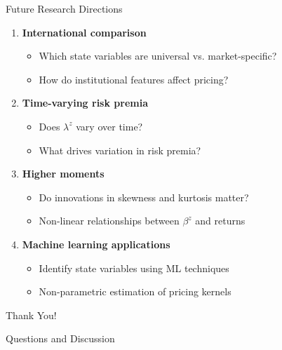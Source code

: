 \documentclass{beamer}
\begin{document}
\begin{frame}{Future Research Directions}
\begin{enumerate}
\item \textbf{International comparison}
\begin{itemize}
\item Which state variables are universal vs. market-specific?
\item How do institutional features affect pricing?
\end{itemize}
\vspace{0.2cm}

\item \textbf{Time-varying risk premia}
\begin{itemize}
\item Does $\lambda^z$ vary over time?
\item What drives variation in risk premia?
\end{itemize}
\vspace{0.2cm}

\item \textbf{Higher moments}
\begin{itemize}
\item Do innovations in skewness and kurtosis matter?
\item Non-linear relationships between $\beta^z$ and returns
\end{itemize}
\vspace{0.2cm}

\item \textbf{Machine learning applications}
\begin{itemize}
\item Identify state variables using ML techniques
\item Non-parametric estimation of pricing kernels
\end{itemize}
\end{enumerate}
\end{frame}

\begin{frame}[c]
\begin{center}
{\Large Thank You!}

\vspace{1cm}

{\large Questions and Discussion}
\end{center}
\end{frame}
\end{document}

